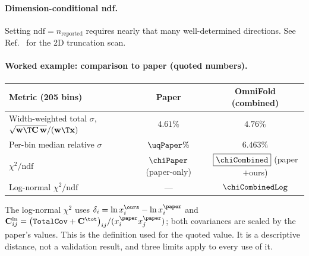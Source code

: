 \paragraph{Dimension-conditional ndf.} Setting $\mathrm{ndf}=n_{\text{reported}}$ requires nearly that many well-determined directions. See Ref.~\cite{NoteRecords2026} for the 2D truncation scan.

\paragraph{Worked example: comparison to paper (quoted numbers).}
\begin{center}
\begin{tabular}{@{}lcc@{}}
\toprule
Metric (205 bins) & Paper & OmniFold (combined) \\
\midrule
Width-weighted total $\sigma$, $\sqrt{\mathbf{w}\T\mathbf{C}\,\mathbf{w}}/(\mathbf{w}\T\mathbf{x})$ & $4.61\%$ & $4.76\%$ \\
Per-bin median relative $\sigma$ & $\uqPaper\%$ & $6.463\%$ \\ %
$\chi^{2}/\mathrm{ndf}$ & $\chiPaper$ (paper-only) & $\boxed{\chiCombined}$ (paper$+$ours) \\
Log-normal $\chi^{2}/\mathrm{ndf}$ & --- & $\chiCombinedLog$ \\
\bottomrule
\end{tabular}
\end{center}
The log-normal $\chi^{2}$ uses $\delta_{i}=\ln x^{\ours}_{i}-\ln x^{\paper}_{i}$ and $\mathbf{C}^{\ln}_{ij}=\big(\texttt{TotalCov}+\mathbf{C}^{\tot}\big)_{ij}/(x^{\paper}_{i}x^{\paper}_{j})$; both covariances are scaled by the paper's values. This is the definition used for the quoted value. It is a descriptive distance, not a validation result, and three limits apply to every use of it.

